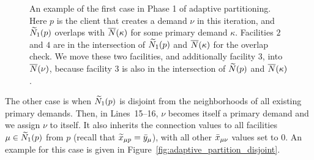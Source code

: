 \documentclass[oneside,final]{ucr}
\def\dsp{\def\baselinestretch{2.0}\large\normalsize}
\begin{document}
\begin{figure}[ht]
      \caption[An example of the first case in Phase 1 of
      adaptive partitioning.]{An example of the first case
        in Phase 1 of adaptive partitioning. Here $p$ is the
        client that creates a demand $\nu$ in this
        iteration, and ${\widetilde N}_1(p)$ overlaps with
        ${\overline{N}}(\kappa)$ for some primary demand
        $\kappa$. Facilities $2$ and $4$ are in the
        intersection of ${\widetilde N}_1(p)$ and ${\overline{N}}(\kappa)$
        for the overlap check. We move these two facilities,
        and additionally facility $3$, into ${\overline{N}}(\nu)$,
        because facility $3$ is also in the intersection of
        ${\widetilde N}(p)$ and ${\overline{N}}(\kappa)$.}
  \label{fig:adaptive_partition_overlap}
\end{figure}
\dsp
The other case is when
${\widetilde N}_1(p)$ is disjoint from the neighborhoods of all
existing primary demands. Then, in Lines~15--16, $\nu$
becomes itself a primary demand and we assign $\nu$ to
itself. It also inherits the connection values to all
facilities $\mu\in{\widetilde N}_1(p)$ from $p$ (recall that
${\widetilde x}_{\mu p} = {\bar y}_{\mu}$), with all other
${\bar x}_{\mu\nu}$ values set to $0$. An example for this case
is given in Figure~\ref{fig:adaptive_partition_disjoint}.
\end{document}
